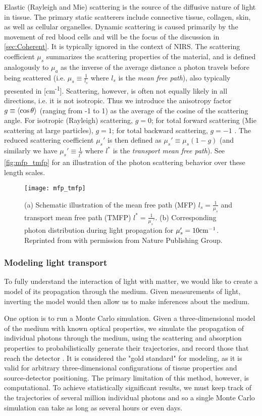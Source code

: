 Elastic (Rayleigh and Mie) scattering is the source of the diffusive nature of light in tissue. The primary static scatterers include connective tissue, collagen, skin, as well as cellular organelles. Dynamic scattering is caused primarily by the movement of red blood cells and will be the focus of the discussion in \autoref{sec:Coherent}. It is typically ignored in the context of NIRS. The scattering coefficient $\mu_s$ summarizes the scattering properties of the material, and is defined analogously to $\mu_a$ as the inverse of the average distance a photon travels before being scattered (i.e. $\mu_s \equiv \frac{1}{l_s}$ where $l_s$ is the \emph{mean free path}), also typically presented in [cm\textsuperscript{-1}]. Scattering, however, is often not equally likely in all directions, i.e. it is not isotropic. Thus we introduce the anisotropy factor $g \equiv \expval{\cos\theta}$ (ranging from -1 to 1) as the average of the cosine of the scattering angle. For isotropic (Rayleigh) scattering, $g=0$; for total forward scattering (Mie scattering at large particles), $g=1$; for total backward scattering, $g=-1$ \cite[ch. 5.2]{Handbook}. The reduced scattering coefficient $\mu_s'$ is then defined as $\mu_s' \equiv \mu_s(1-g)$ (and similarly we have $\mu_s' \equiv \frac{1}{l^*}$ where $l^*$ is the \emph{transport mean free path}). See \autoref{fig:mfp_tmfp} for an illustration of the photon scattering behavior over these length scales. 


\begin{figure}
    \centering
    \texttt{[image: mfp\_tmfp]}
    \caption{(a) Schematic illustration of the mean free path (MFP) $l_s=\frac{1}{\mu_s}$ and transport mean free path (TMFP) $l^*=\frac{1}{\mu_s'}$. (b) Corresponding photon distribution during light propagation for $\mu_s'=10\textnormal{cm}^{-1}$. Reprinted from \cite{Ntziachristos2010} with permission from Nature Publishing Group.}
    \label{fig:mfp_tmfp}
\end{figure}


\subsubsection{Modeling light transport}
To fully understand the interaction of light with matter, we would like to create a model of its propagation through the medium. Given measurements of light, inverting the model would then allow us to make inferences about the medium. 

One option is to run a Monte Carlo simulation. Given a three-dimensional model of the medium with known optical properties, we simulate the propagation of individual photons through the medium, using the scattering and absorption properties to probabilistically generate their trajectories, and record those that reach the detector \cite{Boas2002}. It is considered the "gold standard" for modeling, as it is valid for arbitrary three-dimensional configurations of tissue properties and source-detector positioning. The primary limitation of this method, however, is computational. To achieve statistically significant results, we must keep track of the trajectories of several million individual photons and so a single Monte Carlo simulation can take as long as several hours or even days. 


